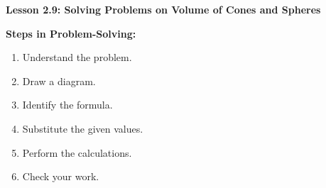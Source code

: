  \begin{center}
\textbf{Lesson 2.9: Solving Problems on Volume of Cones and Spheres}
\end{center}

\vspace*{1ex}


\noindent\textbf{Steps in Problem-Solving:}
\begin{multicols}{2}
\begin{enumerate}[noitemsep, label = \color{blue}\arabic*. ]
    \item Understand the problem.
    \item Draw a diagram.
    \item Identify the formula.
    \item Substitute the given values.
    \item Perform the calculations.
    \item Check your work.
\end{enumerate}
\end{multicols}


